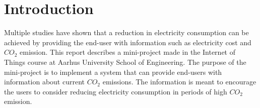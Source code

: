 \documentclass[Main]{subfiles}
\begin{document}
\section{Introduction} %
\label{sec:introduction}
Multiple studies have shown that a reduction in electricity consumption can be achieved by providing the end-user with information such as electricity cost and $CO_2$ emission\cite{tricascade}. 
This report describes a mini-project made in the Internet of Things course at Aarhus University School of Engineering. 
The purpose of the mini-project is to implement a system that can provide end-users with information about current $CO_2$ emissions. 
The information is meant to encourage the users to consider reducing electricity consumption in periods of high $CO_2$ emission.





\end{document}
